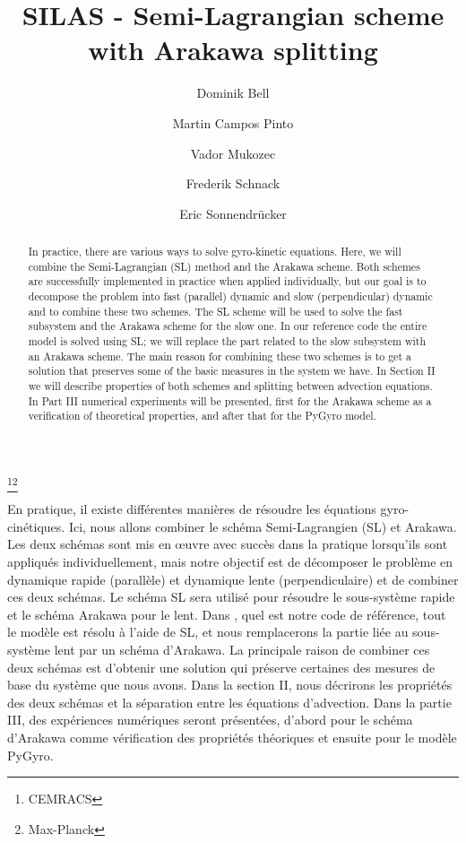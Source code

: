 \documentclass[proc]{edpsmath}
\begin{document}
\title{SILAS - Semi-Lagrangian scheme with Arakawa splitting}
\thanks{CEMRACS}\thanks{Max-Planck}%
%
\author{Dominik Bell}\address{Max-Planck-Institut für Plasmaphysik, Garching, Germany; }
\author{Martin Campos Pinto}
\author{Vador Mukozec}\address{Faculty of Sciences, University of Novi Sad, Serbia; }
\author{Frederik Schnack}
\author{Eric Sonnendrücker}

\begin{abstract}
In practice, there are various ways to solve gyro-kinetic equations. Here, we will combine the Semi-Lagrangian (SL) method and the Arakawa scheme. Both schemes are successfully implemented in practice when applied individually, but our goal is to decompose the problem into fast (parallel) dynamic and slow (perpendicular) dynamic and to combine these two schemes. The SL scheme will be used to solve the fast subsystem and the Arakawa scheme for the slow one. In our reference code \cite{pygyro_code} the entire model is solved using SL; we will replace the part related to the slow subsystem with an Arakawa scheme. The main reason for combining these two schemes is to get a solution that preserves some of the basic measures in the system we have. In Section II we will describe properties of both schemes and splitting between advection equations. In Part III numerical experiments will be presented, first for the Arakawa scheme as a verification of theoretical properties, and after that for the PyGyro model.
\end{abstract}

\begin{resume} %
	En pratique, il existe différentes manières de résoudre les équations gyro-cinétiques. Ici, nous allons combiner le schéma Semi-Lagrangien (SL) et Arakawa. Les deux schémas sont mis en œuvre avec succès dans la pratique lorsqu'ils sont appliqués individuellement, mais notre objectif est de décomposer le problème en dynamique rapide (parallèle) et dynamique lente (perpendiculaire) et de combiner ces deux schémas. Le schéma SL sera utilisé pour résoudre le sous-système rapide et le schéma Arakawa pour le lent. Dans \cite{pygyro_code}, quel est notre code de référence, tout le modèle est résolu à l'aide de SL, et nous remplacerons la partie liée au sous-système lent par un schéma d'Arakawa. La principale raison de combiner ces deux schémas est d'obtenir une solution qui préserve certaines des mesures de base du système que nous avons. Dans la section II, nous décrirons les propriétés des deux schémas et la séparation entre les équations d'advection. Dans la partie III, des expériences numériques seront présentées, d'abord pour le schéma d'Arakawa comme vérification des propriétés théoriques et ensuite pour le modèle PyGyro.
\end{resume}
\end{document}
